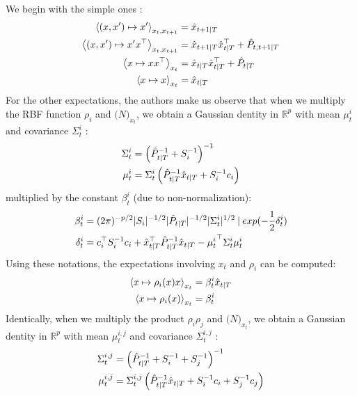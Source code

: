 We begin with the simple ones :
\begin{align*}
  \left< (x,x') \mapsto x'\right>_{x_t,x_{t+1}} &= \hat{x}_{t+1 \mathbin{\vert} T}\\
  \left< (x,x') \mapsto x'x^{\top}\right>_{x_t,x_{t+1}} &= \hat{x}_{t+1 \mathbin{\vert} T} \hat{x}_{t \mathbin{\vert} T}^{\top} + \hat{P}_{t,t+1 \mathbin{\vert} T}\\
  \left< x \mapsto xx^{\top}\right>_{x_t} &= \hat{x}_{t \mathbin{\vert} T} \hat{x}_{t \mathbin{\vert} T}^{\top} + \hat{P}_{t \mathbin{\vert} T}\\
  \left< x \mapsto x\right>_{x_t} &= \hat{x}_{t \mathbin{\vert} T}\\
\end{align*}
For the other expectations, the authors make us observe that when we multiply the RBF function $\rho_i$ and $\mathcal(N)_{x_t}$, we obtain a Gaussian dentity in $\mathbb{R}^p$ with mean $\mu^i_t$ and covariance $\Sigma^i_t$ :
\begin{align*}
  \Sigma^i_t &= \left( \hat{P}_{t \mathbin{\vert} T}^{-1} + S_i^{-1} \right)^{-1}\\
  \mu^i_t &= \Sigma^i_t \left( \hat{P}_{t \mathbin{\vert} T}^{-1} \hat{x}_{t \mathbin{\vert} T} + S_i^{-1}c_i \right)\\
\end{align*}
multiplied by the constant $\beta^i_t$ (due to non-normalization):
\begin{align*}
  \beta^i_t &= (2\pi)^{-p/2} |S_i|^{-1/2} |\hat{P}_{t|T}|^{-1/2} |\Sigma^i_t|^{1/2}\mathbin{\vert} exp(-\frac{1}{2} \delta^i_t)\\
  \delta^i_t &= c_i^{\top} S_i^{-1} c_i + \hat{x}_{t \mathbin{\vert} T}^{\top} \hat{P}_{t \mathbin{\vert} T}^{-1} \hat{x}_{t \mathbin{\vert} T} - {\mu^i_t}^{\top} \Sigma^i_t \mu^i_t\\
\end{align*}
Using these notations, the expectations involving $x_t$ and $\rho_i$ can be computed:
\begin{align*}
  \left< x \mapsto \rho_i(x) x \right>_{x_t} &= \beta^i_t \hat{x}_{t \mathbin{\vert} T}\\
  \left< x \mapsto \rho_i(x) \right>_{x_t} &= \beta^i_t\\
\end{align*}
Identically, when we multiply the product $\rho_i \rho_j$ and $\mathcal(N)_{x_t}$, we obtain a Gaussian dentity in $\mathbb{R}^p$ with mean $\mu^{i,j}_t$ and covariance $\Sigma^{i,j}_t$ :
\begin{align*}
  \Sigma^{i,j}_t &= \left( \hat{P}_{t \mathbin{\vert} T}^{-1} + S_i^{-1} + S_j^{-1} \right)^{-1}\\
  \mu^{i,j}_t &= \Sigma^{i,j}_t \left( \hat{P}_{t \mathbin{\vert} T}^{-1} \hat{x}_{t \mathbin{\vert} T} + S_i^{-1}c_i + S_j^{-1}c_j \right)\\
\end{align*}
